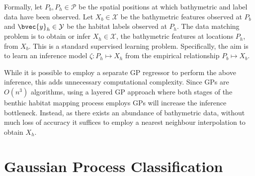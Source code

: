 			Formally, let $P_{b}, P_{h} \in \mathcal{P}$ be the spatial positions at which bathymetric and label data have been observed. Let $X_{b} \in \mathcal{X}$ be the bathymetric features observed at $P_{b}$ and $\bvec{y}_{h} \in \mathcal{Y}$ be the habitat labels observed at $P_{h}$. The data matching problem is to obtain or infer $X_{h} \in \mathcal{X}$, the bathymetric features at locations $P_{h}$, from $X_{b}$. This is a standard supervised learning problem. Specifically, the aim is to learn an inference model $\zeta: P_{h} \mapsto X_{h}$ from the empirical relationship $P_{b} \mapsto X_{b}$.
			
			While it is possible to employ a separate GP regressor to perform the above inference, this adds unnecessary computational complexity. Since GPs are $O(n^{3})$ algorithms, using a layered GP approach where both stages of the benthic habitat mapping process employs GPs will increase the inference bottleneck. Instead, as there exists an abundance of bathymetric data, without much loss of accuracy it suffices to employ a nearest neighbour interpolation to obtain $X_{h}$. 
			
%			
%			
				
	\section{Gaussian Process Classification}
	\label{BenthicHabitatMapping:Classification}
	
